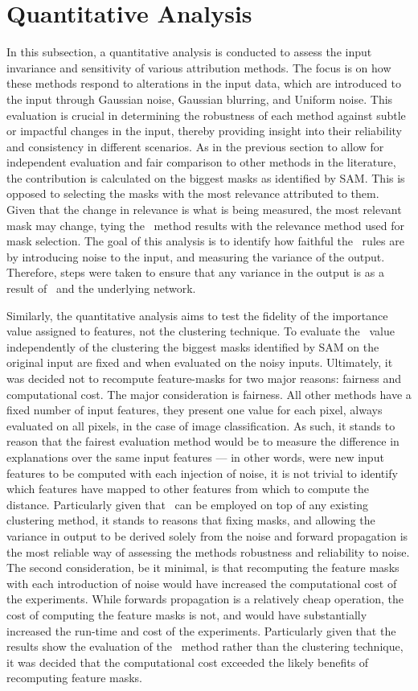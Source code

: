 \section{Quantitative Analysis}
In this subsection, a quantitative analysis is conducted to assess the input invariance and sensitivity of various attribution methods. The focus is on how these methods respond to alterations in the input data, which are introduced to the input through Gaussian noise, Gaussian blurring, and Uniform noise. This evaluation is crucial in determining the robustness of each method against subtle or impactful changes in the input, thereby providing insight into their reliability and consistency in different scenarios. As in the previous section to allow for independent evaluation and fair comparison to other methods in the literature, the contribution is calculated on the biggest masks as identified by SAM.  This is opposed to selecting the masks with the most relevance attributed to them. Given that the change in relevance is what is being measured, the most relevant mask may change, tying the \CTC\ method results with the relevance method used for mask selection. The goal of this analysis is to identify how faithful the \CTC\ rules are by introducing noise to the input, and measuring the variance of the output. Therefore, steps were taken to ensure that any variance in the output is as a result of \CTC\ and the underlying network.


Similarly, the quantitative analysis aims to test the fidelity of the importance value assigned to features, not the clustering technique. To evaluate the \CTC\ value independently of the clustering the biggest masks identified by SAM on the original input are fixed and when evaluated on the noisy inputs. Ultimately, it was decided not to recompute feature-masks for two major reasons: fairness and computational cost. The major consideration is fairness. All other methods have a fixed number of input features, they present one value for each pixel, always evaluated on all pixels, in the case of image classification. As such, it stands to reason that the fairest evaluation method would be to measure the difference in explanations over the same input features --- in other words, were new input features to be computed with each injection of noise, it is not trivial to identify which features have mapped to other features from which to compute the distance. Particularly given that \CTC\ can be employed on top of any existing clustering method, it stands to reasons that fixing masks, and allowing the variance in output to be derived solely from the noise and forward propagation is the most reliable way of assessing the methods robustness and reliability to noise. The second consideration, be it minimal, is that recomputing the feature masks with each introduction of noise would have increased the computational cost of the experiments. While forwards propagation is a relatively cheap operation, the cost of computing the feature masks is not, and would have substantially increased the run-time and cost of the experiments. Particularly given that the results show the evaluation of the \CTC\ method rather than the clustering technique, it was decided that the computational cost exceeded the likely benefits of recomputing feature masks.

